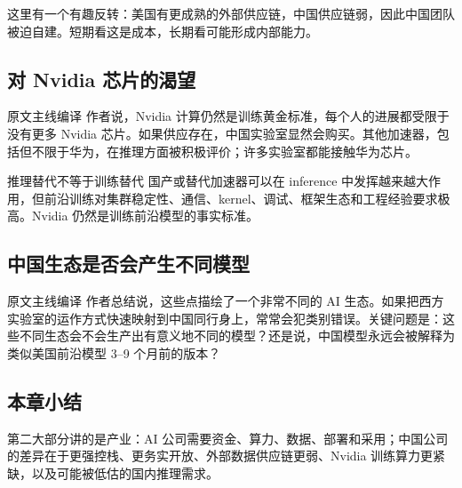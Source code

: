 这里有一个有趣反转：美国有更成熟的外部供应链，中国供应链弱，因此中国团队被迫自建。短期看这是成本，长期看可能形成内部能力。

\subsection{对 Nvidia 芯片的渴望}

\begin{translationbox}{原文主线编译}
作者说，Nvidia 计算仍然是训练黄金标准，每个人的进展都受限于没有更多 Nvidia 芯片。如果供应存在，中国实验室显然会购买。其他加速器，包括但不限于华为，在推理方面被积极评价；许多实验室都能接触华为芯片。
\end{translationbox}

\begin{warningbox}{推理替代不等于训练替代}
国产或替代加速器可以在 inference 中发挥越来越大作用，但前沿训练对集群稳定性、通信、kernel、调试、框架生态和工程经验要求极高。Nvidia 仍然是训练前沿模型的事实标准。
\end{warningbox}

\subsection{中国生态是否会产生不同模型}

\begin{translationbox}{原文主线编译}
作者总结说，这些点描绘了一个非常不同的 AI 生态。如果把西方实验室的运作方式快速映射到中国同行身上，常常会犯类别错误。关键问题是：这些不同生态会不会生产出有意义地不同的模型？还是说，中国模型永远会被解释为类似美国前沿模型 3--9 个月前的版本？
\end{translationbox}

\subsection{本章小结}

第二大部分讲的是产业：AI 公司需要资金、算力、数据、部署和采用；中国公司的差异在于更强控栈、更务实开放、外部数据供应链更弱、Nvidia 训练算力更紧缺，以及可能被低估的国内推理需求。


